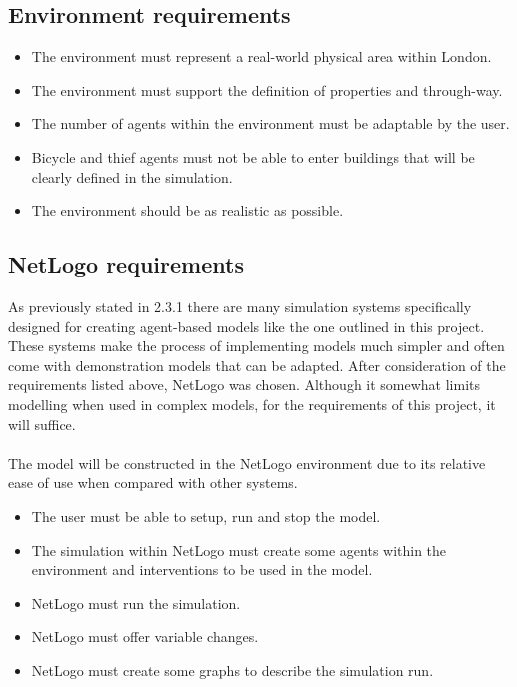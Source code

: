 \documentclass[11pt]{informatics-report}
\begin{document}
\subsection{Environment requirements}
\begin{itemize}
	\item The environment must represent a real-world physical area within London.
	\item The environment must support the definition of properties and through-way.
	\item The number of agents within the environment must be adaptable by the user.
	\item Bicycle and thief agents must not be able to enter buildings that will be clearly defined in the simulation.
	\item The environment should be as realistic as possible.
\end{itemize}

\subsection{NetLogo requirements}
As previously stated in 2.3.1 there are many simulation systems specifically designed for creating agent-based models like the one outlined in this project. These systems make the process of implementing models much simpler and often come with demonstration models that can be adapted. After consideration of the requirements listed above, NetLogo was chosen. Although it somewhat limits modelling when used in complex models, for the requirements of this project, it will suffice. \par
\paragraph{}

The model will be constructed in the NetLogo environment due to its relative ease of use when compared with other systems.
\begin{itemize}
	\item The user must be able to setup, run and stop the model.
	\item The simulation within NetLogo must create some agents within the environment and interventions to be used in the model.
	\item NetLogo must run the simulation.
	\item NetLogo must offer variable changes.
	\item NetLogo must create some graphs to describe the simulation run.
\end{itemize}
\end{document}
